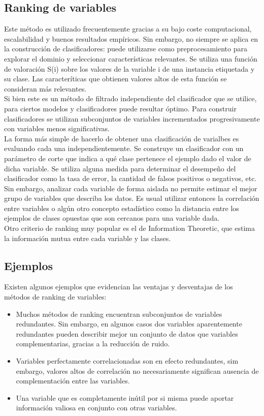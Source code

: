 \documentclass[11pt,spanish]{article}
\begin{document}
\subsection{Ranking de variables}
Este método es utilizado frecuentemente gracias a su bajo coste computacional,
escalabilidad y buenos resultados empíricos. Sin embargo, no siempre se aplica
en la construcción de clasificadores: puede utilizarse como preprocesamiento
para explorar el dominio y seleccionar características relevantes.
Se utiliza una función de valoración S(i) sobre los valores de la variable i
de una instancia etiquetada y su clase. Las caracteríticas que obtienen valores
altos de esta función se consideran más relevantes.\\
Si bien este es un método de filtrado independiente del clasificador que se
utilice, para ciertos modelos y clasificadores puede resultar óptimo.
Para construir clasificadores se utilizan subconjuntos de variables
incrementados progresivamente con variables menos significativas.\\
La forma más simple de hacerlo de obtener una clasificación de varialbes es
evaluando cada una independientemente. Se construye un clasificador con un parámetro de
corte que indica a qué clase pertenece el ejemplo dado el valor de dicha
variable. Se utiliza alguna medida para determinar el desempeño del clasificador
como la tasa de error, la cantidad de falsos positivos o negativos, etc.\\
Sin embargo, analizar cada variable de forma aislada no permite estimar el mejor
grupo de variables que describa los datos. Es usual utilizar entonces la
correlación entre variables o algún otro concepto estadístico como la distancia
entre los ejemplos de clases opuestas que son cercanos para una variable dada.\\
Otro criterio de ranking muy popular es el de Information Theoretic, que estima
la información mutua entre cada variable y las clases.

\subsection{Ejemplos}
Existen algunos ejemplos que evidencian las ventajas y desventajas de los
métodos de ranking de variables:
\begin{itemize}
    \item Muchos métodos de ranking encuentran subconjuntos de variables
    redundantes. Sin embargo, en algunos casos dos variables aparentemente
    redundantes pueden describir mejor un conjunto de datos que variables
    complementarias, gracias a la reducción de ruido.
    \item Variables perfectamente correlacionadas son en efecto redundantes,
    sim embargo, valores altos de correlación no necesariamente significan
    ausencia de complementación entre las variables.
    \item Una variable que es completamente inútil por si misma puede aportar
    información valiosa en conjunto con otras variables.
\end{itemize}
\end{document}
